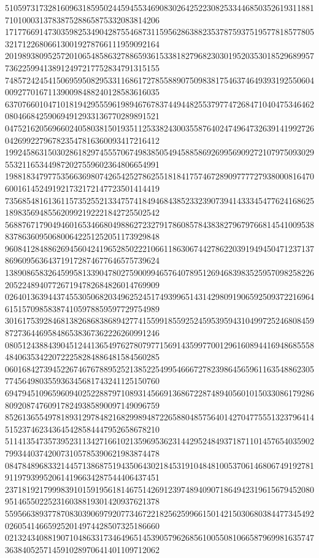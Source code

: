 \begin{DoxyCode}
      510597317328160963185950244594553469083026425223082533446850352619311881710100031378387528865875332083814206
      171776691473035982534904287554687311595628638823537875937519577818577805321712268066130019278766111959092164
      201989380952572010654858632788659361533818279682303019520353018529689957736225994138912497217752834791315155
      748572424541506959508295331168617278558890750983817546374649393192550604009277016711390098488240128583616035
      637076601047101819429555961989467678374494482553797747268471040475346462080466842590694912933136770289891521
      047521620569660240580381501935112533824300355876402474964732639141992726042699227967823547816360093417216412
      199245863150302861829745557067498385054945885869269956909272107975093029553211653449872027559602364806654991
      198818347977535663698074265425278625518184175746728909777727938000816470600161452491921732172147723501414419
      735685481613611573525521334757418494684385233239073941433345477624168625189835694855620992192221842725502542
      568876717904946016534668049886272327917860857843838279679766814541009538837863609506800642251252051173929848
      960841284886269456042419652850222106611863067442786220391949450471237137869609563643719172874677646575739624
      138908658326459958133904780275900994657640789512694683983525957098258226205224894077267194782684826014769909
      026401363944374553050682034962524517493996514314298091906592509372216964615157098583874105978859597729754989
      301617539284681382686838689427741559918559252459539594310499725246808459872736446958486538367362226260991246
      080512438843904512441365497627807977156914359977001296160894416948685558484063534220722258284886481584560285
      060168427394522674676788952521385225499546667278239864565961163548862305774564980355936345681743241125150760
      694794510965960940252288797108931456691368672287489405601015033086179286809208747609178249385890097149096759
      852613655497818931297848216829989487226588048575640142704775551323796414515237462343645428584447952658678210
      511413547357395231134271661021359695362314429524849371871101457654035902799344037420073105785390621983874478
      084784896833214457138687519435064302184531910484810053706146806749192781911979399520614196634287544406437451
      237181921799983910159195618146751426912397489409071864942319615679452080951465502252316038819301420937621378
      559566389377870830390697920773467221825625996615014215030680384477345492026054146659252014974428507325186660
      021324340881907104863317346496514539057962685610055081066587969981635747363840525714591028970641401109712062

\end{DoxyCode}
